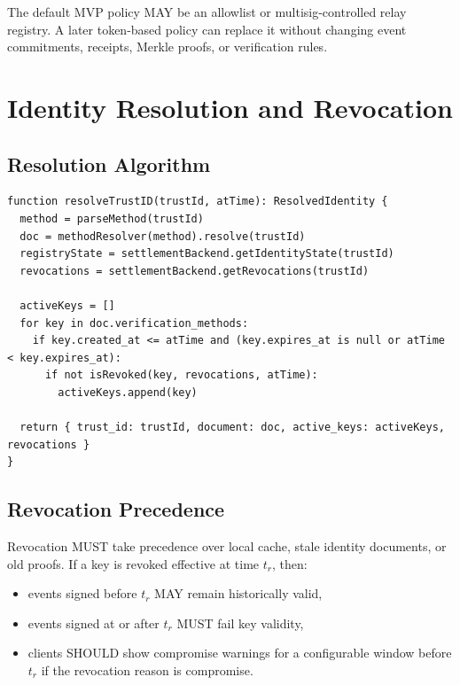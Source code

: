 \documentclass[11pt]{article}
\begin{document}
The default MVP policy MAY be an allowlist or multisig-controlled relay registry. A later token-based policy can replace it without changing event commitments, receipts, Merkle proofs, or verification rules.

\section{Identity Resolution and Revocation}

\subsection{Resolution Algorithm}

\begin{lstlisting}[style=tslcode]
function resolveTrustID(trustId, atTime): ResolvedIdentity {
  method = parseMethod(trustId)
  doc = methodResolver(method).resolve(trustId)
  registryState = settlementBackend.getIdentityState(trustId)
  revocations = settlementBackend.getRevocations(trustId)

  activeKeys = []
  for key in doc.verification_methods:
    if key.created_at <= atTime and (key.expires_at is null or atTime < key.expires_at):
      if not isRevoked(key, revocations, atTime):
        activeKeys.append(key)

  return { trust_id: trustId, document: doc, active_keys: activeKeys, revocations }
}
\end{lstlisting}

\subsection{Revocation Precedence}

Revocation MUST take precedence over local cache, stale identity documents, or old proofs. If a key is revoked effective at time \(t_r\), then:

\begin{itemize}
    \item events signed before \(t_r\) MAY remain historically valid,
    \item events signed at or after \(t_r\) MUST fail key validity,
    \item clients SHOULD show compromise warnings for a configurable window before \(t_r\) if the revocation reason is compromise.
\end{itemize}
\end{document}

